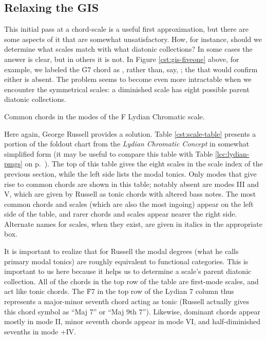 \FloatBarrier
\subsection{Relaxing the GIS}
\label{subsec:relaxing-gis}

This initial pass at a chord-scale \gis is a useful first approximation, but
there are some aspects of it that are somewhat unsatisfactory. How, for
instance, should we determine what scales match with what diatonic
collections? In some cases the answer is clear, but in others it is not. In
Figure \ref{cst:gis-fiveone} above, for example, we labeled the \h{G7} chord
as , rather than, say, ; the
 that would confirm either is absent. The problem seems to become even
more intractable when we encounter the symmetrical scales: a diminished scale
has eight possible parent diatonic collections.

\begin{table}[p]
  \caption{Common chords in the modes of the F Lydian Chromatic scale.}
  \label{cst:scale-table}
\end{table}

Here again, George Russell provides a solution. Table \ref{cst:scale-table}
presents a portion of the foldout chart from the \emph{Lydian Chromatic Concept}
in somewhat simplified form (it may be useful to compare this table with Table
\ref{lcc:lydian-pmgs} on p.~\pageref{lcc:lydian-pmgs}). The top of this table
gives the eight scales in the scale index of the previous section, while the
left side lists the modal tonics. Only modes that give rise to
common chords are shown in this table; notably absent are modes III and V,
which are given by Russell as tonic chords with altered bass notes. The most
common chords and scales (which are also the most ingoing) appear on the left
side of the table, and rarer chords and scales appear nearer the right side.
Alternate names for scales, when they exist, are given in italics in the
appropriate box.

It is important to realize that for Russell the modal degrees (what he calls
primary modal tonics) are roughly equivalent to functional categories. This is
important to us here because it helps us to determine a scale's parent
diatonic collection. All of the chords in the top row of the table are
first-mode scales, and act like tonic chords. The \h{F7} in the top row of the
Lydian \flat{}7 column thus represents a major-minor seventh chord acting as
tonic (Russell actually gives this chord symbol as ``Maj \flat{}7'' or ``Maj
9th \flat{}7''). Likewise, dominant chords appear mostly in mode II, minor
seventh chords appear in mode VI, and half-diminished sevenths in mode
+IV.


